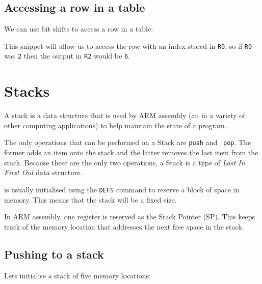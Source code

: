 \documentclass{article}
\begin{document}
\subsection{Accessing a row in a table}

We can use bit shifts to access a row in a table:


This snippet will allow us to access the row with an index stored in {\tt R0},
so if {\tt R0} was {\tt 2} then the output in {\tt R2} would be {\tt 6}.

\section{Stacks}


A stack is a data structure that is used by ARM assembly (an in a variety of
other computing applications) to help maintain the state of a program.

The only operations that can be performed on a Stack are {\tt push} and {\tt
pop}. The former adds an item onto the stack and the latter removes the last
item from the stack. Because these are the only two operations, a Stack is a
type of {\it Last In First Out} data structure.

is usually initialised using the {\tt DEFS} command to reserve a block of space
in memory. This means that the stack will be a fixed size.

In ARM assembly, one register is reserved as the Stack Pointer (SP). This keeps
track of the memory location that addresses the next free space in the stack.

\subsection{Pushing to a stack}

Lets initialise a stack of five memory locations:
\end{document}
